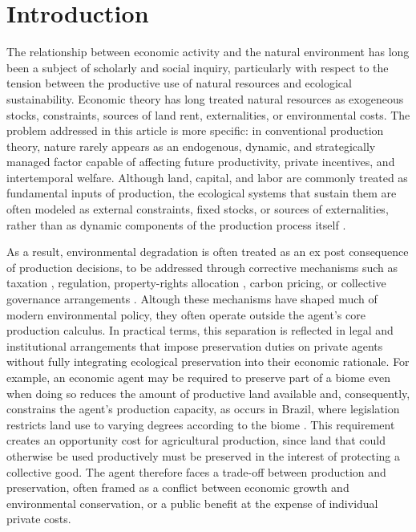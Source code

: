 \section{Introduction}


The relationship between economic activity and the natural environment has long been a subject of scholarly and social inquiry, particularly with respect to the tension between the productive use of natural resources and ecological sustainability. Economic theory has long treated natural resources as exogeneous stocks, constraints, sources of land rent, externalities, or environmental costs. The problem addressed in this article is more specific: in conventional production theory, nature rarely appears as an endogenous, dynamic, and strategically managed factor capable of affecting future productivity, private incentives, and intertemporal welfare. Although land, capital, and labor are commonly treated as fundamental inputs of production, the ecological systems that sustain them are often modeled as external constraints, fixed stocks, or sources of externalities, rather than as dynamic components of the production process itself \cite{jehle2011, stiglitz1989reflections, dasgupta2001human}.

As a result, environmental degradation is often treated as an ex post consequence of production decisions, to be addressed through corrective mechanisms such as taxation \cite{pigou2010liberty}, regulation, property-rights allocation \cite{hardin1968tragedy}, carbon pricing, or collective governance arrangements \cite{ostrom2002commonpool}. Altough these mechanisms have shaped much of modern environmental policy, they often operate outside the agent's core production calculus. In practical terms, this separation is reflected in legal and institutional arrangements that impose preservation duties on private agents without fully integrating ecological preservation into their economic rationale. For example, an economic agent may be required to preserve part of a biome even when doing so reduces the amount of productive land available and, consequently, constrains the agent's production capacity, as occurs in Brazil, where legislation restricts land use to varying degrees according to the biome \cite{brasil2012florestal}. This requirement creates an opportunity cost for agricultural production, since land that could otherwise be used productively must be preserved in the interest of protecting a collective good. The agent therefore faces a trade-off between production and preservation, often framed as a conflict between economic growth and environmental conservation, or a public benefit at the expense of individual private costs.




